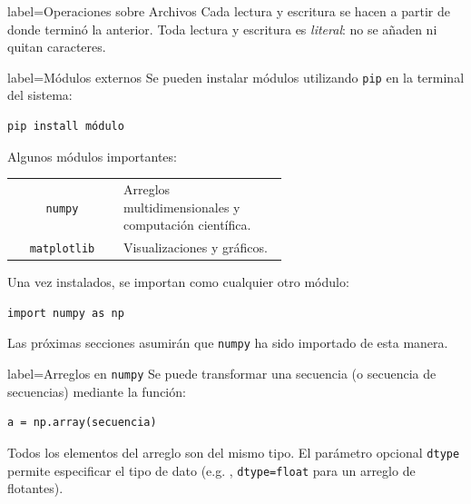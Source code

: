 \documentclass[10pt]{article}
\begin{document}
\begin{multicols*}{3}
\begin{contentbox}{label=Operaciones sobre Archivos}
    Cada lectura y escritura se hacen a partir de donde terminó la anterior. Toda lectura y escritura es \emph{literal}: no se añaden ni quitan caracteres.
    
\end{contentbox}

\begin{contentbox}{label=Módulos externos}
    Se pueden instalar módulos utilizando \lstinline!pip! en la terminal del sistema:
\begin{lstlisting}[language=bash]
pip install módulo
\end{lstlisting}

    Algunos módulos importantes:
    
    \begin{tabular}{C|p{0.6\linewidth}}
        \lstinline!numpy! & Arreglos multidimensionales y computación científica. \\
        \lstinline!matplotlib! & Visualizaciones y gráficos.
    \end{tabular}
    
    Una vez instalados, se importan como cualquier otro módulo:
\begin{lstlisting}
import numpy as np
\end{lstlisting}
    Las próximas secciones asumirán que \lstinline!numpy! ha sido importado de esta manera.
\end{contentbox}

\begin{contentbox}{label=Arreglos en \lstinline!numpy!}
    Se puede transformar una secuencia (o secuencia de secuencias) mediante la función:
\begin{lstlisting}
a = np.array(secuencia)
\end{lstlisting}
    
    Todos los elementos del arreglo son del mismo tipo. El parámetro opcional \lstinline!dtype! permite especificar el tipo de dato (e.g. , \lstinline!dtype=float! para un arreglo de flotantes).
    

\end{contentbox}
\end{multicols*}
\end{document}
